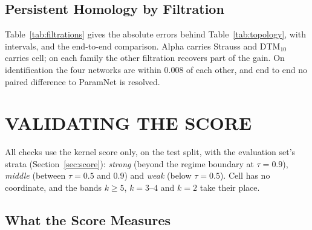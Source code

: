 \subsection{Persistent Homology by Filtration}
\label{app:filtrations}

Table~\ref{tab:filtrations} gives the absolute errors behind Table~\ref{tab:topology}, with intervals, and the
end-to-end comparison. Alpha carries Strauss and DTM$_{10}$ carries cell; on each family the other filtration recovers
part of the gain. On identification the four networks are within $0.008$ of each other, and end to end no paired
difference to ParamNet is resolved.

\begin{table}[h]
\caption{Which filtration carries what topology adds. Columns are the same network, trainer and stopping rule on four
input sets: ``both'' persistence filtrations (ParamNet), ``alpha'' or ``DTM'' alone, and ``neither'' (the summary
curves only). Cells are $\mathrm{RMSE}(\log\theta)/\mathrm{s.d.}$ in the structured regime ($\tau{=}0.9$), where $1$
is the error of predicting the training mean, then balanced accuracy at $\tau{=}0.9$, then ParamNet's end-to-end skill
minus each column's, paired on the same $1\,439$ patterns. Intervals are $95\%$ over test $\theta$ (errors, accuracy)
or over patterns (skill). One training seed, so differences under about $0.005$ in error are within seed noise.}
\label{tab:filtrations}
\begin{center}
\footnotesize

\end{center}
\end{table}


\section{VALIDATING THE SCORE}
\label{app:score}

All checks use the kernel score only, on the test split, with the evaluation set's strata (Section~\ref{sec:score}):
\emph{strong} (beyond the regime boundary at $\tau=0.9$), \emph{middle} (between $\tau=0.5$ and $0.9$) and \emph{weak}
(below $\tau=0.5$). Cell has no coordinate, and the bands $k\ge5$, $k=3$--$4$ and $k=2$ take their place.

\subsection{What the Score Measures}
\label{app:score-def}

